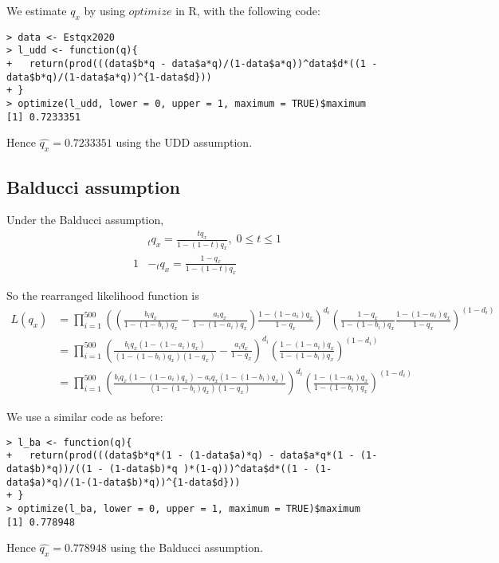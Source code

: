\documentclass[a4paper,11pt]{article}
\theoremstyle{mytheor}
\begin{document}
We estimate $q_x$ by using $optimize$ in R, with the following code:
\begin{lstlisting}[label={list:first},caption=Code to estimate $q_x$ under the UDD assumption]
> data <- Estqx2020
> l_udd <- function(q){
+   return(prod(((data$b*q - data$a*q)/(1-data$a*q))^data$d*((1 - data$b*q)/(1-data$a*q))^{1-data$d}))
+ }
> optimize(l_udd, lower = 0, upper = 1, maximum = TRUE)$maximum
[1] 0.7233351
\end{lstlisting}

Hence $\hat{q_x} = 0.7233351$ using the UDD assumption.

\subsection*{Balducci assumption}

Under the Balducci assumption,
\begin{align*}
   & _tq_x  = \frac{tq_x}{1-(1-t)q_x}, \; 0 \leq t \leq 1 \\
   1 & - _tq_x  = \frac{1-q_x}{1-(1-t)q_x}
\end{align*}

So the rearranged likelihood function is
\begin{align*}
    L(q_x) & = \prod_{i = 1}^{500}\left(\left(\frac{b_iq_x}{1-(1-b_i)q_x} - \frac{a_iq_x}{1-(1-a_i)q_x}\right) \frac{1-(1-a_i)q_x}{1-q_x}\right)^{d_i}\left(\frac{1-q_x}{1-(1-b_i)q_x}\frac{1-(1-a_i)q_x}{1-q_x}\right)^{(1-d_i)} \\
    & = \prod_{i = 1}^{500}\left(\frac{b_iq_x(1-(1-a_i)q_x)}{(1-(1-b_i)q_x)(1-q_x)} - \frac{a_iq_x}{1-q_x}\right)^{d_i}\left(\frac{1-(1-a_i)q_x}{1-(1-b_i)q_x}\right)^{(1-d_i)} \\
    & = \prod_{i = 1}^{500}\left(\frac{b_iq_x(1-(1-a_i)q_x) - a_iq_x(1-(1-b_i)q_x)}{(1-(1-b_i)q_x)(1-q_x)}\right)^{d_i}\left(\frac{1-(1-a_i)q_x}{1-(1-b_i)q_x}\right)^{(1-d_i)}
\end{align*}

We use a similar code as before:
\begin{lstlisting}[label={list:second},caption=Code to estimate $q_x$ under the Balducci assumption]
> l_ba <- function(q){
+   return(prod(((data$b*q*(1 - (1-data$a)*q) - data$a*q*(1 - (1-data$b)*q))/((1 - (1-data$b)*q )*(1-q)))^data$d*((1 - (1-data$a)*q)/(1-(1-data$b)*q))^{1-data$d}))
+ }
> optimize(l_ba, lower = 0, upper = 1, maximum = TRUE)$maximum
[1] 0.778948
\end{lstlisting}

Hence $\hat{q_x} = 0.778948$ using the Balducci assumption.
\end{document}
